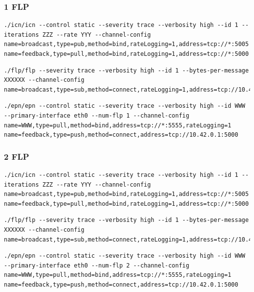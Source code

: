 \documentclass[]{article}
\begin{document}
\subsubsection{1 FLP}
\begin{lstlisting}
./icn/icn --control static --severity trace --verbosity high --id 1 --iterations ZZZ --rate YYY --channel-config name=broadcast,type=pub,method=bind,rateLogging=1,address=tcp://*:5005 name=feedback,type=pull,method=bind,rateLogging=1,address=tcp://*:5000
\end{lstlisting}

\begin{lstlisting}
./flp/flp --severity trace --verbosity high --id 1 --bytes-per-message XXXXXX --channel-config name=broadcast,type=sub,method=connect,rateLogging=1,address=tcp://10.42.0.1:5005
\end{lstlisting}

\begin{lstlisting}
./epn/epn --control static --severity trace --verbosity high --id WWW --primary-interface eth0 --num-flp 1 --channel-config name=WWW,type=pull,method=bind,address=tcp://*:5555,rateLogging=1 name=feedback,type=push,method=connect,address=tcp://10.42.0.1:5000
\end{lstlisting}

\subsubsection{2 FLP}
\begin{lstlisting}
./icn/icn --control static --severity trace --verbosity high --id 1 --iterations ZZZ --rate YYY --channel-config name=broadcast,type=pub,method=bind,rateLogging=1,address=tcp://*:5005 name=feedback,type=pull,method=bind,rateLogging=1,address=tcp://*:5000
\end{lstlisting}

\begin{lstlisting}
./flp/flp --severity trace --verbosity high --id 1 --bytes-per-message XXXXXX --channel-config name=broadcast,type=sub,method=connect,rateLogging=1,address=tcp://10.42.0.1:5005
\end{lstlisting}

\begin{lstlisting}
./epn/epn --control static --severity trace --verbosity high --id WWW --primary-interface eth0 --num-flp 2 --channel-config name=WWW,type=pull,method=bind,address=tcp://*:5555,rateLogging=1 name=feedback,type=push,method=connect,address=tcp://10.42.0.1:5000
\end{lstlisting}
\end{document}
